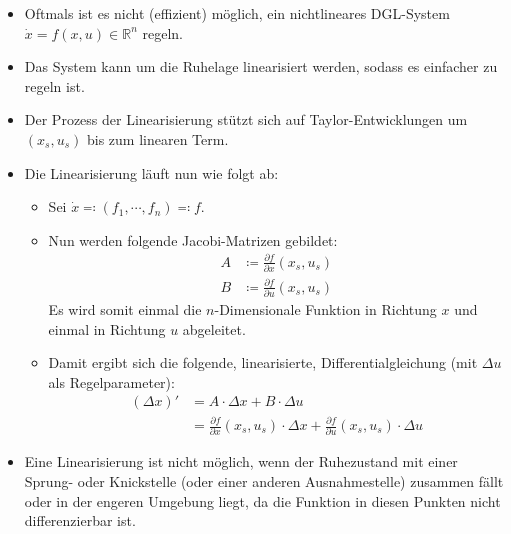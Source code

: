             \begin{itemize}
            	\item Oftmals ist es nicht (effizient) möglich, ein nichtlineares DGL-System \( \dot{x} = f(x, u) \in \mathbb{R} ^ n \) regeln.
            	\item Das System kann um die Ruhelage linearisiert werden, sodass es einfacher zu regeln ist.
            	\item Der Prozess der Linearisierung stützt sich auf Taylor-Entwicklungen um \( (x _ s, u _ s) \) bis zum linearen Term.
            	\item Die Linearisierung läuft nun wie folgt ab:
                	\begin{itemize}
                		\item Sei \( \dot{x} \eqqcolon (f _ 1, \cdots, f _ n) \eqqcolon f \).
                		\item Nun werden folgende Jacobi-Matrizen gebildet:
	                		\begin{align*}
		                		A &\coloneqq \frac{\partial f}{\partial x} (x _ s, u _ s) \\
		                		B &\coloneqq \frac{\partial f}{\partial u} (x _ s, u _ s)
	                		\end{align*}
	                		Es wird somit einmal die \(n\)-Dimensionale Funktion in Richtung \(x\) und einmal in Richtung \(u\) abgeleitet.
	                	\item Damit ergibt sich die folgende, linearisierte, Differentialgleichung (mit \( \Delta u \) als Regelparameter):
		                	\begin{align*}
			                	{(\Delta x)}' &= A \cdot \Delta x + B \cdot \Delta u \\
			                	              &= \frac{\partial f}{\partial x} (x _ s, u _ s) \cdot \Delta x + \frac{\partial f}{\partial u} (x _ s, u _ s) \cdot \Delta u
		                	\end{align*}
	                \end{itemize}
	            \item Eine Linearisierung ist nicht möglich, wenn der Ruhezustand mit einer Sprung- oder Knickstelle (oder einer anderen Ausnahmestelle) zusammen fällt oder in der engeren Umgebung liegt, da die Funktion in diesen Punkten nicht differenzierbar ist.
            \end{itemize}

